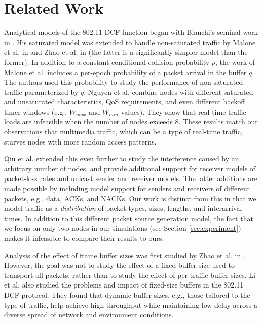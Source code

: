 \documentclass[conference]{IEEEtran}
\begin{document}
\section{Related Work}
Analytical models of the 802.11 DCF function began with Bianchi's seminal work in \cite{bianchi1996performance}. His saturated model was extended to handle non-saturated traffic by Malone et al. in \cite{dcf-nonsaturated} and Zhao et al. in \cite{zhao2009simple} (the latter is a significantly simpler model than the former). In addition to a constant conditional collision probability $p$, the work of Malone et al. includes a per-epoch probability of a packet arrival in the buffer $q$. The authors used this probability to study the performance of non-saturated traffic parameterized by $q$. Nguyen et al. \cite{nguyen2012performance} combine nodes with different saturated and unsaturated characteristics, QoS requirements, and even different backoff timer windows (e.g., $W_{max}$ and $W_{min}$ values). They show that real-time traffic loads are infeasible when the number of nodes exceeds $8$. These results match our observations that multimedia traffic, which can be a type of real-time traffic, starves nodes with more random access patterns.

Qiu et al. \cite{qiu2007general} extended this even further to study the interference caused by an arbitrary number of nodes, and provide additional support for receiver models of packet-loss rates and unicast sender and receiver models. The latter additions are made possible by including model support for senders and receivers of different packets, e.g., data, ACKs, and NACKs. Our work is distinct from this in that we model traffic as a \emph{distribution} of packet types, sizes, lengths, and interarrival times. In addition to this different packet source generation model, the fact that we focus on only two nodes in our simulations (see Section \ref{sec:experiment}) makes it infeasible to compare their results to ours. 

Analysis of the effect of frame buffer sizes was first studied by Zhao et al. in \cite{zhao2011modeling}. However, the goal was not to study the effect of a fixed buffer size used to transport all packets, rather than to study the effect of per-traffic buffer sizes. Li et al. \cite{li2011buffer} also studied the problems and impact of fixed-size buffers in the 802.11 DCF protocol. They found that dynamic buffer sizes, e.g., those tailored to the type of traffic, help achieve high throughput while maintaining low delay across a diverse spread of network and environment conditions. 
\end{document}
